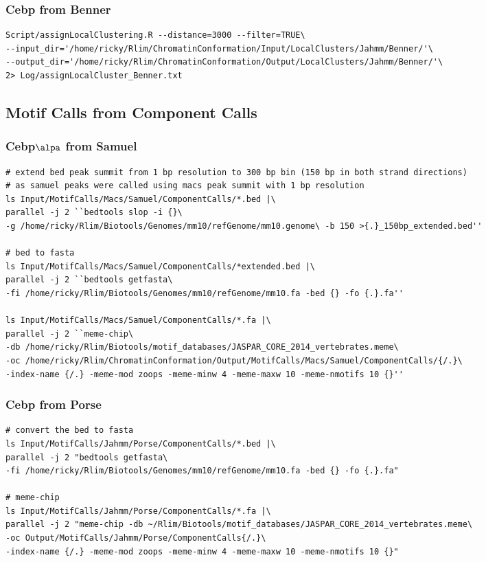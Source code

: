 \documentclass{article}\usepackage[]{graphicx}\usepackage[]{color}
\begin{document}
\subsubsection{Cebp from Benner}
\begin{verbatim}
Script/assignLocalClustering.R --distance=3000 --filter=TRUE\ 
--input_dir='/home/ricky/Rlim/ChromatinConformation/Input/LocalClusters/Jahmm/Benner/'\ 
--output_dir='/home/ricky/Rlim/ChromatinConformation/Output/LocalClusters/Jahmm/Benner/'\ 
2> Log/assignLocalCluster_Benner.txt

\end{verbatim}

\subsection{Motif Calls from Component Calls}
\subsubsection{Cebp$\alpa$ from Samuel}

\begin{verbatim}
# extend bed peak summit from 1 bp resolution to 300 bp bin (150 bp in both strand directions)
# as samuel peaks were called using macs peak summit with 1 bp resolution
ls Input/MotifCalls/Macs/Samuel/ComponentCalls/*.bed |\ 
parallel -j 2 ``bedtools slop -i {}\ 
-g /home/ricky/Rlim/Biotools/Genomes/mm10/refGenome/mm10.genome\ -b 150 >{.}_150bp_extended.bed''

# bed to fasta
ls Input/MotifCalls/Macs/Samuel/ComponentCalls/*extended.bed |\ 
parallel -j 2 ``bedtools getfasta\ 
-fi /home/ricky/Rlim/Biotools/Genomes/mm10/refGenome/mm10.fa -bed {} -fo {.}.fa''

ls Input/MotifCalls/Macs/Samuel/ComponentCalls/*.fa |\ 
parallel -j 2 ``meme-chip\ 
-db /home/ricky/Rlim/Biotools/motif_databases/JASPAR_CORE_2014_vertebrates.meme\ 
-oc /home/ricky/Rlim/ChromatinConformation/Output/MotifCalls/Macs/Samuel/ComponentCalls/{/.}\ 
-index-name {/.} -meme-mod zoops -meme-minw 4 -meme-maxw 10 -meme-nmotifs 10 {}''

\end{verbatim}

\subsubsection{Cebp from Porse}
\begin{verbatim}
# convert the bed to fasta
ls Input/MotifCalls/Jahmm/Porse/ComponentCalls/*.bed |\ 
parallel -j 2 "bedtools getfasta\ 
-fi /home/ricky/Rlim/Biotools/Genomes/mm10/refGenome/mm10.fa -bed {} -fo {.}.fa"

# meme-chip
ls Input/MotifCalls/Jahmm/Porse/ComponentCalls/*.fa |\ 
parallel -j 2 "meme-chip -db ~/Rlim/Biotools/motif_databases/JASPAR_CORE_2014_vertebrates.meme\ 
-oc Output/MotifCalls/Jahmm/Porse/ComponentCalls{/.}\ 
-index-name {/.} -meme-mod zoops -meme-minw 4 -meme-maxw 10 -meme-nmotifs 10 {}"
\end{verbatim}
\end{document}
